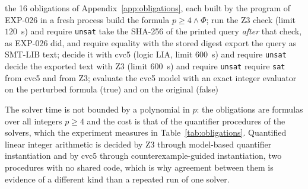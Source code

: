 \documentclass[11pt]{article}
\theoremstyle{definition}
\theoremstyle{remark}
\begin{document}
\begin{algorithm}[ht]
\caption{Decision of the Presburger obligations by two solvers (computations EXP-026 and EXP-069).}
\label{alg:solvers}
\begin{algorithmic}[1]
\Require the 16 obligations of Appendix~\ref{app:obligations}, each built by the program of EXP-026 in a fresh process
  \State build the formula $p\geq4\wedge\Phi$; run the Z3 check (limit $120$~s) and require \texttt{unsat}
  \State take the SHA-256 of the printed query \emph{after} that check, as EXP-026 did, and require equality with the stored digest
  \State export the query as SMT-LIB text; decide it with cvc5 (logic LIA, limit $600$~s) and require \texttt{unsat}
  \State decide the exported text with Z3 (limit $600$~s) and require \texttt{unsat}
\EndFor
{}
  \State require \texttt{sat} from cvc5 and from Z3; evaluate the cvc5 model with an exact integer evaluator on the perturbed formula (true) and on the original (false)
\EndFor
\end{algorithmic}
\end{algorithm}

The solver time is not bounded by a polynomial in $p$: the obligations are formulas over all
integers $p\geq4$ and the cost is that of the quantifier procedures of the solvers, which the
experiment measures in Table~\ref{tab:obligations}. Quantified linear integer arithmetic is
decided by Z3 \cite{DeMouraBjorner2008} through model-based quantifier instantiation and by
cvc5 \cite{Barbosa2022} through counterexample-guided instantiation, two procedures with no shared code, which is why
agreement between them is evidence of a different kind than a repeated run of one solver.
\end{document}
